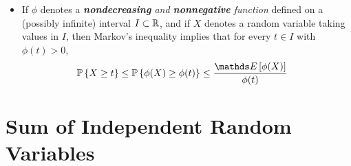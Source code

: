 \documentclass[11pt]{article}
\begin{document}
\begin{itemize}
\item  \begin{remark}
If $\phi$ denotes a \emph{\textbf{nondecreasing} and \textbf{nonnegative} function} defined on a (possibly infinite) interval $I \subset {\mathbb R}$, and if $X$ denotes a random variable taking values in $I$, then Markov's inequality implies that for every $t \in I$ with $\phi(t) > 0$,
\begin{align}
\bP\set{X \ge t} \le \bP\set{\phi(X) \ge \phi(t)} &\le \frac{\E{}{\phi(X)}}{\phi(t)}  \label{ineqn: generalized_markov_inequality}
\end{align}
\end{remark}
\end{itemize}

\section{Sum of Independent Random Variables}
\end{document}
